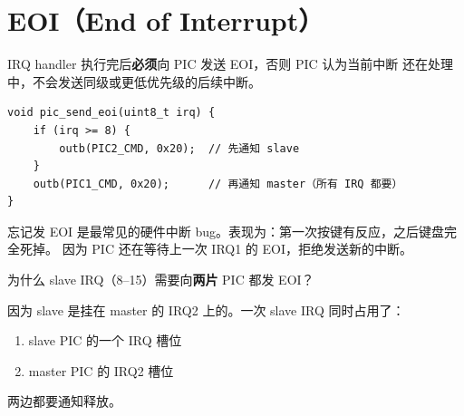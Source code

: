 \section{EOI（End of Interrupt）}

IRQ handler 执行完后\textbf{必须}向 PIC 发送 EOI，否则 PIC 认为当前中断
还在处理中，不会发送同级或更低优先级的后续中断。

\begin{lstlisting}[style=cstyle]
void pic_send_eoi(uint8_t irq) {
    if (irq >= 8) {
        outb(PIC2_CMD, 0x20);  // 先通知 slave
    }
    outb(PIC1_CMD, 0x20);      // 再通知 master（所有 IRQ 都要）
}
\end{lstlisting}

\begin{warnbox}
忘记发 EOI 是最常见的硬件中断 bug。表现为：第一次按键有反应，之后键盘完全死掉。
因为 PIC 还在等待上一次 IRQ1 的 EOI，拒绝发送新的中断。
\end{warnbox}

\begin{thinkbox}
为什么 slave IRQ（8--15）需要向\textbf{两片} PIC 都发 EOI？

因为 slave 是挂在 master 的 IRQ2 上的。一次 slave IRQ 同时占用了：
\begin{enumerate}
  \item slave PIC 的一个 IRQ 槽位
  \item master PIC 的 IRQ2 槽位
\end{enumerate}
两边都要通知释放。
\end{thinkbox}


